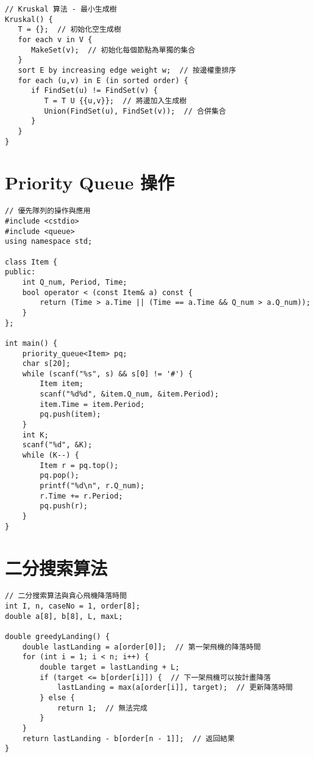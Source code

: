 \documentclass{article}
\begin{document}
\begin{multicols}{2}
\begin{lstlisting}
// Kruskal 算法 - 最小生成樹
Kruskal() {
   T = {};  // 初始化空生成樹
   for each v in V {
      MakeSet(v);  // 初始化每個節點為單獨的集合
   }
   sort E by increasing edge weight w;  // 按邊權重排序
   for each (u,v) in E (in sorted order) {
      if FindSet(u) != FindSet(v) {
         T = T U {{u,v}};  // 將邊加入生成樹
         Union(FindSet(u), FindSet(v));  // 合併集合
      }
   }
}
\end{lstlisting}

\section{Priority Queue 操作}

\begin{lstlisting}
// 優先隊列的操作與應用
#include <cstdio>
#include <queue>
using namespace std;

class Item {     
public:
    int Q_num, Period, Time;
    bool operator < (const Item& a) const {
        return (Time > a.Time || (Time == a.Time && Q_num > a.Q_num));
    }
};

int main() {       
    priority_queue<Item> pq;
    char s[20];
    while (scanf("%s", s) && s[0] != '#') {
        Item item;
        scanf("%d%d", &item.Q_num, &item.Period);
        item.Time = item.Period;
        pq.push(item);
    }
    int K;
    scanf("%d", &K);
    while (K--) {
        Item r = pq.top();
        pq.pop();
        printf("%d\n", r.Q_num);
        r.Time += r.Period;
        pq.push(r);
    }
}
\end{lstlisting}

\section{二分搜索算法}

\begin{lstlisting}
// 二分搜索算法與貪心飛機降落時間
int I, n, caseNo = 1, order[8]; 
double a[8], b[8], L, maxL;

double greedyLanding() {
    double lastLanding = a[order[0]];  // 第一架飛機的降落時間
    for (int i = 1; i < n; i++) {
        double target = lastLanding + L;
        if (target <= b[order[i]]) {  // 下一架飛機可以按計畫降落
            lastLanding = max(a[order[i]], target);  // 更新降落時間
        } else {
            return 1;  // 無法完成
        }
    }
    return lastLanding - b[order[n - 1]];  // 返回結果
}
\end{lstlisting}


\end{multicols}
\end{document}
